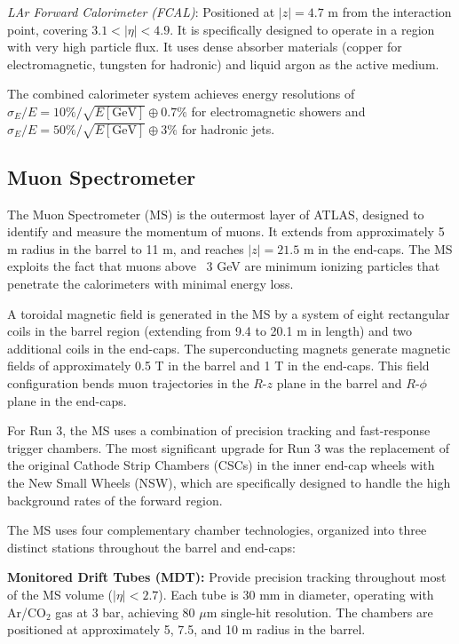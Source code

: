 \textit{LAr Forward Calorimeter (FCAL)}: Positioned at $|z| = 4.7$ m from the interaction point, covering $3.1 < |\eta| < 4.9$. It is specifically designed to operate in a region with very high particle flux. It uses dense absorber materials (copper for electromagnetic, tungsten for hadronic) and liquid argon as the active medium.

The combined calorimeter system achieves energy resolutions of $\sigma_E/E = 10\%/\sqrt{E[\text{GeV}]} \oplus 0.7\%$ for electromagnetic showers and $\sigma_E/E = 50\%/\sqrt{E[\text{GeV}]} \oplus 3\%$ for hadronic jets.





\subsection{Muon Spectrometer}

The Muon Spectrometer (MS) is the outermost layer of ATLAS, designed to identify and measure the momentum of muons. It extends from approximately 5 m radius in the barrel to 11 m, and reaches $|z| = 21.5$ m in the end-caps. The MS exploits the fact that muons above ~3 GeV are minimum ionizing particles that penetrate the calorimeters with minimal energy loss.

A toroidal magnetic field is generated in the MS by a system of eight rectangular coils in the barrel region (extending from 9.4 to 20.1 m in length) and two additional coils in the end-caps. The superconducting magnets generate magnetic fields of approximately 0.5 T in the barrel and 1 T in the end-caps. This field configuration bends muon trajectories in the $R$-$z$ plane in the barrel and $R$-$\phi$ plane in the end-caps.

For Run 3, the MS uses a combination of precision tracking and fast-response trigger chambers. The most significant upgrade for Run 3 was the replacement of the original Cathode Strip Chambers (CSCs) in the inner end-cap wheels with the New Small Wheels (NSW), which are specifically designed to handle the high background rates of the forward region.

The MS uses four complementary chamber technologies, organized into three distinct stations throughout the barrel and end-caps:


\textbf{Monitored Drift Tubes (MDT):} Provide precision tracking throughout most of the MS volume ($|\eta| < 2.7$). Each tube is 30 mm in diameter, operating with Ar/CO$_2$ gas at 3 bar, achieving 80 $\mu$m single-hit resolution. The chambers are positioned at approximately 5, 7.5, and 10 m radius in the barrel.

